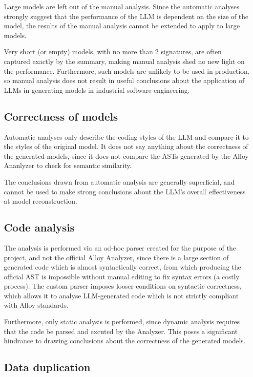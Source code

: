\documentclass[conference]{IEEEtran}
\begin{document}
Large models are left out of the manual analysis. Since the automatic analyses strongly suggest that the performance of the LLM is dependent on the size of the model, the results of the manual analysis cannot be extended to apply to large models.

Very short (or empty) models, with no more than 2 signatures, are often captured exactly by the summary, making manual analysis shed no new light on the performance. Furthermore, such models are unlikely to be used in production, so manual analysis does not result in useful conclusions about the application of LLMs in generating models in industrial software engineering.

\subsection{Correctness of models}

Automatic analyses only describe the coding styles of the LLM and compare it to the styles of the original model. It does not say anything about the correctness of the generated models, since it does not compare the ASTs generated by the Alloy Ananlyzer to check for semantic similarity.

The conclusions drawn from automatic analysis are generally superficial, and cannot be used to make strong conclusions about the LLM's overall effectiveness at model reconstruction.

\subsection{Code analysis}

The analysis is performed via an ad-hoc parser created for the purpose of the project, and not the official Alloy Analyzer, since there is a large section of generated code which is almost syntactically correct, from which producing the official AST is impossible without manual editing to fix syntax errors (a costly process). The custom parser imposes looser conditions on syntactic correctness, which allows it to analyse LLM-generated code which is not strictly compliant with Alloy standards.

Furthermore, only static analysis is performed, since dynamic analysis requires that the code be parsed and excuted by the Analyzer. This poses a significant hindrance to drawing conclusions about the correctness of the generated models.

\subsection{Data duplication}
\end{document}
